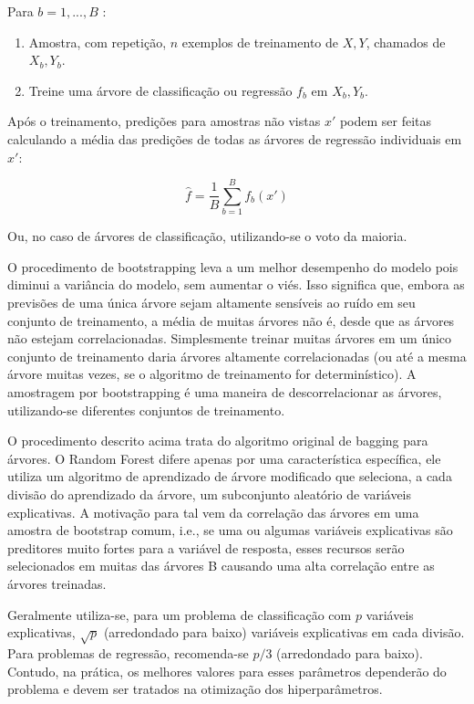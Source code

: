 Para $ b = 1, ..., B $ :

\begin{enumerate}
	\item Amostra, com repetição, $ n $ exemplos de treinamento de $ X, Y $, chamados de $ X_b, Y_b $.
	\item Treine uma árvore de classificação ou regressão $ f_b $ em $ X_b, Y_b $.
\end{enumerate}

Após o treinamento, predições para amostras não vistas $ x' $ podem ser feitas calculando a média das predições de todas as árvores de regressão individuais em $ x' $:

\begin{equation}
{\displaystyle {\hat {f}}={\frac {1}{B}}\sum _{b=1}^{B}f_{b}(x')}
\end{equation}

Ou, no caso de árvores de classificação, utilizando-se o voto da maioria.

O procedimento de bootstrapping leva a um melhor desempenho do modelo pois diminui a variância do modelo, sem aumentar o viés. Isso significa que, embora as previsões de uma única árvore sejam altamente sensíveis ao ruído em seu conjunto de treinamento, a média de muitas árvores não é, desde que as árvores não estejam correlacionadas. Simplesmente treinar muitas árvores em um único conjunto de treinamento daria árvores altamente correlacionadas (ou até a mesma árvore muitas vezes, se o algoritmo de treinamento for determinístico). A amostragem por bootstrapping é uma maneira de descorrelacionar as árvores, utilizando-se diferentes conjuntos de treinamento.

O procedimento descrito acima trata do algoritmo original de bagging para árvores. O Random Forest difere apenas por uma característica específica, ele utiliza um algoritmo de aprendizado de árvore modificado que seleciona, a cada divisão do aprendizado da árvore, um subconjunto aleatório de variáveis explicativas. A motivação para tal vem da correlação das árvores em uma amostra de bootstrap comum, i.e., se uma ou algumas variáveis explicativas são preditores muito fortes para a variável de resposta, esses recursos serão selecionados em muitas das árvores B causando uma alta correlação entre as árvores treinadas.

Geralmente utiliza-se, para um problema de classificação com $ p $ variáveis explicativas, $ \sqrt{p} $ (arredondado para baixo) variáveis explicativas ​​em cada divisão. Para problemas de regressão, recomenda-se $ p/3 $ (arredondado para baixo). Contudo, na prática, os melhores valores para esses parâmetros dependerão do problema e devem ser tratados na otimização dos hiperparâmetros.

